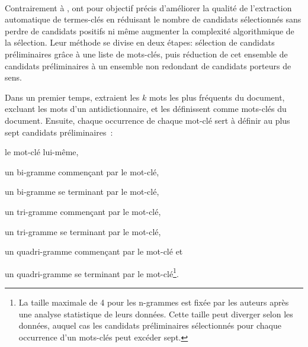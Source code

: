     ~\\Contrairement à ,
     ont pour objectif précis d'améliorer
    la qualité de l'extraction automatique de termes-clés en réduisant le nombre
    de candidats sélectionnés sans perdre de candidats positifs ni même
    augmenter la complexité algorithmique de la sélection. Leur méthode se
    divise en deux étapes: sélection de candidats préliminaires grâce à une
    liste de mots-clés, puis réduction de cet ensemble de candidats
    préliminaires à un ensemble non redondant de candidats porteurs de sens.

    Dans un premier temps,  extraient les
    $k$ mots les plus fréquents du document, excluant les mots d'un
    antidictionnaire, et les définissent comme mots-clés du document. Ensuite,
    chaque occurrence de chaque mot-clé sert à définir au plus sept candidats
    préliminaires~:
    \begin{enumerate*}
      \item{le mot-clé lui-même,}
      \item{un bi-gramme commençant par le mot-clé,}
      \item{un bi-gramme se terminant par le mot-clé,}
      \item{un tri-gramme commençant par le mot-clé,}
      \item{un tri-gramme se terminant par le mot-clé,}
      \item{un quadri-gramme commençant par le mot-clé et}
      \item{un quadri-gramme se terminant par le mot-clé\footnote{La taille
            maximale de 4 pour les n-grammes est fixée par les auteurs après
            une analyse statistique de leurs données. Cette taille peut diverger
            selon les données, auquel cas les candidats préliminaires
            sélectionnés pour chaque occurrence d'un mots-clés peut excéder
            sept.}.}
    \end{enumerate*}

    \begin{example}
    \end{example}

